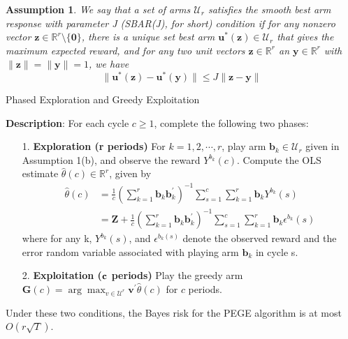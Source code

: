 \documentclass{article}
\theoremstyle{plain}
\newtheorem{assumption}{Assumption}
\theoremstyle{definition}
\begin{document}


\begin{assumption}
We say that a set of arms $\mathcal{U}_{r}$ satisfies the smooth best arm response with parameter J (SBAR(J), for short) condition if for any nonzero vector $\textbf{z}\in \mathbb{R}^{r}\setminus\{\textbf{0}\}$, there is a unique set best arm $\textbf{u}^{*}(\textbf{z})\in \mathcal{U}_{r}$ that gives the maximum expected reward, and for any two unit vectors $\textbf{z}\in \mathbb{R}^{r}$ an $\textbf{y}\in \mathbb{R}^{r}$ with $\|\textbf{z}\|=\|\textbf{y}\|=1$, we have
\begin{equation}
\|\textbf{u}^{*}(\textbf{z})-\textbf{u}^{*}(\textbf{y})\|\leq J \|\textbf{z}-\textbf{y}\| \nonumber 
\end{equation}
\end{assumption}


\begin{algorithm}\label{alg:PEGE}
\caption{Phased Exploration and Greedy Exploitation}
\textbf{Description}: For each cycle $c\geq 1$, complete the following two phases:
\begin{itemize}
\item [1. ] \textbf{Exploration (r periods)} For $k=1,2,\cdots,r$, play arm $\textbf{b}_{k}\in \mathcal{U}_{r}$ given in Assumption 1(b), and observe the reward $Y^{b_{k}}(c)$. Compute the OLS estimate $\hat{\theta}(c)\in \mathbb{R}^{r}$, given by
\begin{align}
\hat{\theta}(c)&=\frac{1}{c}(\sum_{k=1}^{r}\textbf{b}_{k}\textbf{b}_{k}^{'})^{-1}\sum_{s=1}^{c}\sum_{k=1}^{r}\textbf{b}_{k}Y^{b_{k}}(s) \nonumber \\
&=\textbf{Z}+\frac{1}{c}(\sum_{k=1}^{r}\textbf{b}_{k}\textbf{b}_{k}^{'})^{-1}\sum_{s=1}^{c}\sum_{k=1}^{r}\textbf{b}_{k}\epsilon^{b_{k}}(s) \nonumber 
\end{align}
where for any k, $Y^{b_{k}}(s)$, and $\epsilon^{b_{k}(s)}$ denote the observed reward and the error random variable associated with playing arm $\textbf{b}_{k}$ in cycle s.
\item [2. ] \textbf{Exploitation ($\bold{c}$ periods)} Play the greedy arm $\textbf{G}(c)=\arg \max_{v\in \mathcal{U}^{r}}\textbf{v}^{'}\hat{\theta}(c)$ for $c$ periods.
\end{itemize}
\end{algorithm}


Under these two conditions, the Bayes risk for the PEGE algorithm is at most $O(r\sqrt{T})$.
\end{document}
